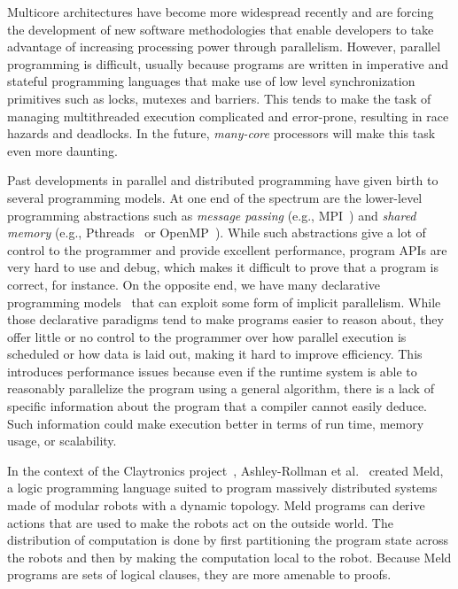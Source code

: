 Multicore architectures have become more widespread recently and are forcing the
development of new software methodologies that enable developers to take
advantage of increasing processing power through parallelism. However, parallel
programming is difficult, usually because programs are written in imperative and
stateful programming languages that make use of low level synchronization
primitives such as locks, mutexes and barriers. This tends to make the task of
managing multithreaded execution complicated and error-prone, resulting in race
hazards and deadlocks. In the future, \emph{many-core} processors will make this
task even more daunting.

Past developments in parallel and distributed programming have given birth to
several programming models. At one end of the spectrum are the lower-level
programming abstractions such as \emph{message passing} (e.g.,
MPI~\cite{gabriel04-open-mpi}) and \emph{shared memory} (e.g.,
Pthreads~\cite{Butenhof:1997:PPT:263953} or
OpenMP~\cite{Chapman-2007-UOP-1370966}). While such abstractions give a lot of
control to the programmer and provide excellent performance, program APIs are
very hard to use and debug, which makes it difficult to prove that a program is
correct, for instance. On the opposite end, we have many declarative programming
models~\cite{Blelloch:1996:PPA:227234.227246} that can exploit some form of
implicit parallelism.  While those declarative paradigms tend to make programs
easier to reason about, they offer little or no control to the programmer over
how parallel execution is scheduled or how data is laid out, making it hard to
improve efficiency. This introduces performance issues because even if the
runtime system is able to reasonably parallelize the program using a general
algorithm, there is a lack of specific information about the program that a
compiler cannot easily deduce. Such information could make execution better in
terms of run time, memory usage, or scalability.

In the context of the Claytronics project~\cite{goldstein-computer05},
Ashley-Rollman et al.~\cite{ashley-rollman-iclp09,
ashley-rollman-derosa-iros07wksp} created Meld, a logic programming language
suited to program massively distributed systems made of modular robots with a
dynamic topology. Meld programs can derive actions that are used to make the
robots act on the outside world. The distribution of computation is done by
first partitioning the program state across the robots and then by making the
computation local to the robot. Because Meld programs are sets of logical
clauses, they are more amenable to proofs.

